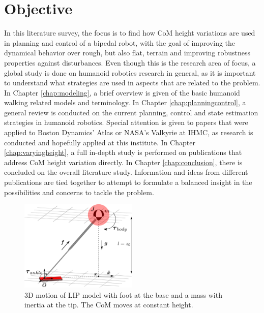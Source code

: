 \section{Objective}
In this literature survey, the focus is to find how \ac{CoM} height variations are used in planning and control of a bipedal robot, with the goal of improving the dynamical behavior over rough, but also flat, terrain and improving robustness properties against disturbances. Even though this is the research area of focus, a global study is done on humanoid robotics research in general, as it is important to understand what strategies are used in aspects that are related to the problem. \\
In Chapter \ref{chap:modeling}, a brief overview is given of the basic humanoid walking related models and terminology. In Chapter \ref{chap:planningcontrol}, a general review is conducted on the current planning, control and state estimation strategies in humanoid robotics. Special attention is given to papers that were applied to Boston Dynamics' Atlas or NASA's Valkyrie at IHMC, as research is conducted and hopefully applied at this institute. In Chapter \ref{chap:varyingheight}, a full in-depth study is performed on publications that address \ac{CoM} height variation directly. In Chapter \ref{chap:conclusion}, there is concluded on the overall literature study. Information and ideas from different publications are tied together to attempt to formulate a balanced insight in the possibilities and concerns to tackle the problem.
\begin{figure}[h]
\centering
\includegraphics[width=0.5\textwidth]{STYLESTUFF/3DCoMfootinertiaz0.png}
\caption{\ac{3D} motion of \ac{LIP} model with foot at the base and a mass with inertia at the tip. The \ac{CoM} moves at constant height.}
\label{fig:3dlipfootinertiaz0}
\end{figure}




